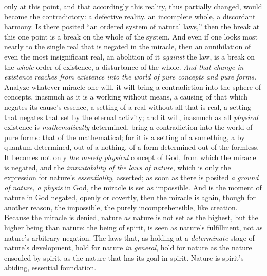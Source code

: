 \documentclass[12pt,a4paper]{book}
\begin{document}
only at this point, and that accordingly this reality, thus partially changed, would become
the contradictory: a defective reality, an incomplete whole, a discordant harmony. Is there
posited ``an ordered system of natural laws,'' then the break at this one point is a break on
the whole of the system. And even if one looks most nearly to the single real that is negated
in the miracle, then an annihilation of even the most insignificant real, an abolition of it
\emph{against} the law, is a break on the \emph{whole} order of existence, a disturbance of the whole.
\emph{And that change in existence reaches from existence into the world of pure concepts and
pure forms.} Analyze whatever miracle one will, it will bring a contradiction into the sphere
of concepts, inasmuch as it is a working without means, a causing of that which negates its
cause's essence, a setting of a real without all that is real, a setting that negates that set
by the eternal activity; and it will, inasmuch as all \emph{physical} existence is
\emph{mathematically} determined, bring a contradiction into the world of pure forms: that of the
mathematical; for it is a setting of a something, a by quantum determined, out of a nothing,
of a form-determined out of the formless. It becomes not only \emph{the merely physical} concept of
God, from which the miracle is negated, and the \emph{immutability of the laws of nature}, which is
only the expression for nature's \emph{essentiality}, asserted; as soon as there is posited \emph{a ground
of nature, a physis} in God, the miracle is set as impossible. And is the moment of nature in
God negated, openly or covertly, then the miracle is again, though for another reason, the
impossible, the purely incomprehensible, like creation. Because the miracle is denied, nature
\emph{as} nature is not set as the highest, but the higher being than nature: the being of spirit, is
seen as nature's fulfillment, not as nature's arbitrary negation. The laws that, as holding at
a \emph{determinate} stage of nature's development, hold for nature \emph{in general}, hold for nature
as the nature ensouled by spirit, as the nature that has its goal in spirit. Nature is spirit's
abiding, essential foundation.
\end{document}
